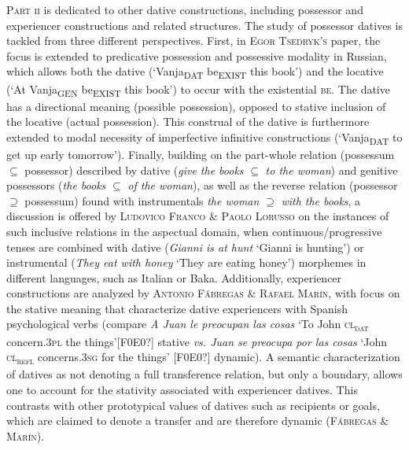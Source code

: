 \documentclass[output=paper,modfonts,nonflat,colorlinks,citecolor=brown]{langsci/langscibook}
\begin{document}
{\textsc{Part ii} is dedicated to} other{ dative constructions, including possessor and experiencer constructions and related structures. The study of possessor datives is tackled from three different perspectives. First, in \textsc{Egor Tsedryk’s} paper,} the focus is extended to predicative possession and possessive modality in Russian, which allows both the dative (‘Vanja\textsc{\textsubscript{DAT}} be\textsc{\textsubscript{EXIST}} this book’) and the locative (‘At Vanja\textsubscript{GEN} be\textsubscript{EXIST} this book’) to occur with the existential \textsc{be}. The dative has a directional meaning (possible possession), opposed to stative inclusion of the locative (actual possession). This construal of the dative is furthermore extended to modal necessity of imperfective infinitive constructions (‘Vanja\textsubscript{DAT} to get up early tomorrow’).  Finally, building on the part-whole relation (possessum {${\subseteq}$} possessor) described by dative ({\textit{give the books} ${\subseteq}$ \textit{to the woman}}) and genitive possessors ({\textit{the books} ${\subseteq}$ \textit{of the woman}}), as well as the reverse relation (possessor {${\supseteq}$} possessum) found with instrumentals {\textit{the woman} ${\supseteq}$ \textit{with the books}}, a discussion is offered by \textsc{Ludovico Franco \& Paolo Lorusso} on the instances of such inclusive relations in the aspectual domain, when continuous/progressive tenses are combined with dative ({\textit{Gianni is at hunt}} ‘Gianni is hunting’) or instrumental ({\textit{They eat with honey}} ‘They are eating honey’) morphemes in different languages, such as Italian or Baka. Additionally, experiencer{ constructions are analyzed by \textsc{Antonio Fábregas \& Rafael Marín}, with focus on the stative meaning that characterize dative experiencers with Spanish psychological verbs (compare \textit{A Juan le preocupan las cosas} ‘To John \textsc{cl\textsubscript{dat}} concern.\textsc{3pl} the things’[F0E0?] stative \textit{vs. Juan se preocupa por las cosas} ‘John \textsc{cl\textsubscript{refl}} concerns.\textsc{3sg} for the things’ [F0E0?] dynamic). A semantic characterization of datives as not denoting a full transference relation, but only a boundary, allows one to account for the stativity associated with experiencer datives. This contrasts with other prototypical values of datives such as recipients or goals, which are claimed to denote a transfer and are therefore dynamic} ({\textsc{Fábregas \& Marín}}).
\end{document}
